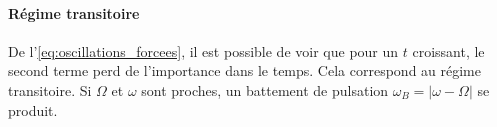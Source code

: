 \paragraph*{Régime transitoire}
De l'\autoref{eq:oscillations_forcees}, il est possible de voir que pour un \(t\) croissant, le second terme perd de l'importance dans le temps. Cela correspond au régime transitoire. Si \(\Omega\) et \(\omega\) sont proches, un battement de pulsation \(\omega_B = |\omega- \Omega|\) se produit.
